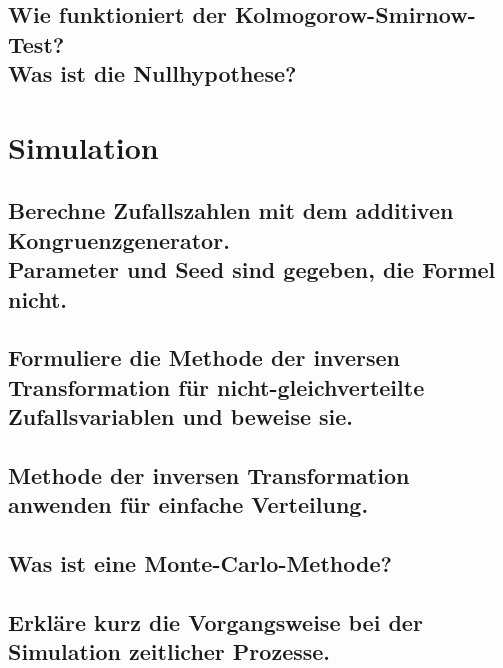 \documentclass[a4paper,10pt]{article}
\begin{document}
\subsection{Wie funktioniert der Kolmogorow-Smirnow-Test? \\ Was ist die Nullhypothese?}

\newpage
\section{Simulation}
\subsection{Berechne Zufallszahlen mit dem additiven Kongruenz\-generator.
\\ Parameter und Seed sind gegeben, die Formel nicht.}

\subsection{Formuliere die Methode der in\-versen Trans\-for\-ma\-tion für nicht-\-gleich\-ver\-teilte Zufallsvariablen und beweise sie.}

\subsection{Methode der inversen Transformation anwenden für einfache Verteilung.}

\subsection{Was ist eine Monte-Carlo-Methode?}

\subsection{Erkläre kurz die Vorgangsweise bei der Simulation zeitlicher Prozesse.}
\end{document}
